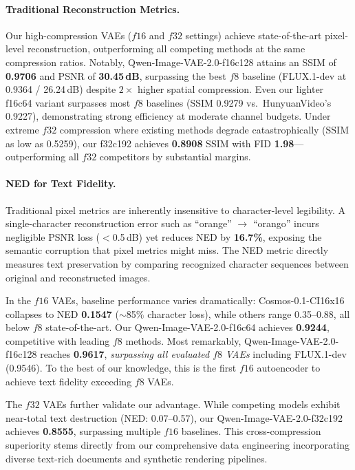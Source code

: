 \documentclass{llmxive}
\begin{document}
\paragraph{Traditional Reconstruction Metrics.}
Our high-compression VAEs ($f16$ and $f32$ settings) achieve state-of-the-art pixel-level reconstruction, outperforming all competing methods at the same compression ratios. Notably, Qwen-Image-VAE-2.0-f16c128 attains an SSIM of \textbf{0.9706} and PSNR of \textbf{30.45\,dB}, surpassing the best $f8$ baseline (FLUX.1-dev at 0.9364 / 26.24\,dB) despite $2\times$ higher spatial compression. Even our lighter f16c64 variant surpasses most $f8$ baselines (SSIM 0.9279 vs.\ HunyuanVideo's 0.9227), demonstrating strong efficiency at moderate channel budgets. Under extreme $f32$ compression where existing methods degrade catastrophically (SSIM as low as 0.5259), our f32c192 achieves \textbf{0.8908} SSIM with FID \textbf{1.98}---outperforming all $f32$ competitors by substantial margins.

\paragraph{NED for Text Fidelity.}
Traditional pixel metrics are inherently insensitive to character-level legibility. A single-character reconstruction error such as ``orange'' $\to$ ``orango'' incurs negligible PSNR loss ($<$0.5\,dB) yet reduces NED by \textbf{16.7\%}, exposing the semantic corruption that pixel metrics might miss. The NED metric directly measures text preservation by comparing recognized character sequences between original and reconstructed images.

In the $f16$ VAEs, baseline performance varies dramatically: Cosmos-0.1-CI16x16 collapses to NED \textbf{0.1547} (${\sim}$85\% character loss), while others range 0.35--0.88, all below $f8$ state-of-the-art. Our Qwen-Image-VAE-2.0-f16c64 achieves \textbf{0.9244}, competitive with leading $f8$ methods. Most remarkably, Qwen-Image-VAE-2.0-f16c128 reaches \textbf{0.9617}, \emph{surpassing all evaluated $f8$ VAEs} including FLUX.1-dev (0.9546). To the best of our knowledge, this is the first $f16$ autoencoder to achieve text fidelity exceeding $f8$ VAEs.

The $f32$ VAEs further validate our advantage. While competing models exhibit near-total text destruction (NED: 0.07--0.57), our Qwen-Image-VAE-2.0-f32c192 achieves \textbf{0.8555}, surpassing multiple $f16$ baselines. This cross-compression superiority stems directly from our comprehensive data engineering incorporating diverse text-rich documents and synthetic rendering pipelines.
\end{document}
